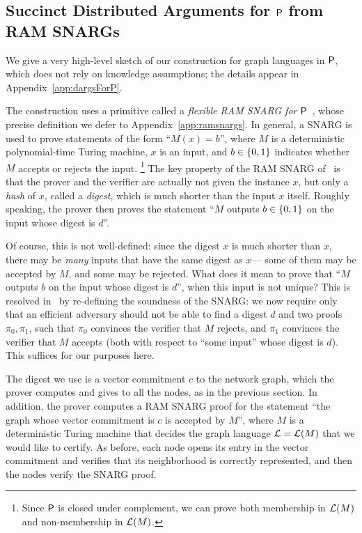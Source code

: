 \subsection{Succinct Distributed Arguments for ${\mathsf{P}}$ from RAM SNARGs}\label{sec:dargsForP}
We give a very high-level sketch of our construction for graph languages in ${\mathsf{P}}$,
which does not rely on knowledge assumptions; the details appear in Appendix~\ref{app:dargsForP}.

The construction uses a primitive called a \emph{flexible RAM SNARG for ${\mathsf{P}}$}~\cite{KP16,cryptoeprint:2022/1320},
whose precise definition we defer to Appendix~\ref{app:ramsnargs}.
In general, a %
SNARG is used to prove statements of the form ``$M(x) = b$'',
where $M$ is a deterministic polynomial-time Turing machine, $x$ is an input,
and $b \in \left \{{0,1} \right \}$ indicates whether $M$ accepts or rejects the input.%
\footnote{Since ${\mathsf{P}}$ is closed under complement, we can prove both membership in $\mathcal{L}(M)$
and non-membership in $\mathcal{L}(M)$.}
The key property of the RAM SNARG of~\cite{KP16,cryptoeprint:2022/1320} is that 
the prover and the verifier
are actually not given the instance $x$,
but only a \emph{hash} of $x$, called a \emph{digest},
which is much shorter than the input $x$ itself.
Roughly speaking, the prover then proves the statement ``$M$ outputs $b \in \left \{{0,1} \right \}$
on the input whose digest is $d$''.

Of course, this is not well-defined: since the digest $x$ is much shorter than $x$,
there may be \emph{many} inputs that have the same digest as $x$---%
some of them may be accepted by $M$, and some may be rejected.
What does it mean to prove that ``$M$ outputs $b$ on the input whose digest is $d$'',
when this input is not unique?
This is resolved in~\cite{KP16} by re-defining
the soundness of the SNARG:
we now require only that 
an
efficient adversary should not be able to find a digest $d$ and two proofs $\pi_0, \pi_1$,
such that $\pi_0$ convinces the verifier that $M$ rejects,
and $\pi_1$ convinces the verifier that $M$ accepts (both with respect to ``some input'' whose digest is $d$).
This suffices for our purposes here.

The digest we use is a vector commitment $c$ to the network graph, which the prover
computes and gives to all the nodes, as in the previous section.
In addition, the prover computes a RAM SNARG proof for the statement ``the graph whose vector commitment
is $c$ is accepted by $M$'', where $M$ is a deterministic Turing machine that decides
the graph language $\mathcal{L} = \mathcal{L}(M)$ that we would like to certify.
As before, each node opens its entry in the vector commitment and verifies that its neighborhood
is correctly represented, and then the nodes verify the SNARG proof.

